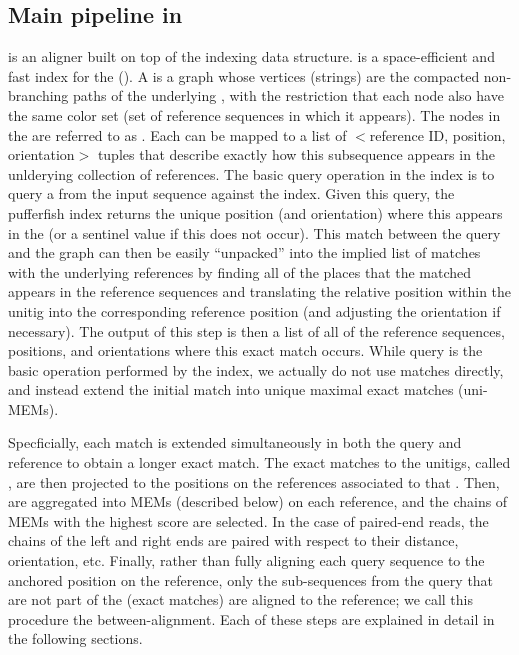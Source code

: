 \subsection{Main pipeline in \puffaligner}
\puffaligner is an aligner built on top of the \pufferfish indexing data structure. \pufferfish is a 
space-efficient and fast index for the \ccdbg (\ccdbgshort). A \ccdbg is a graph whose vertices
(strings) are the compacted non-branching paths of the underlying \dbg, with the restriction that 
each node also have the same color set (set of reference sequences in which it appears). The nodes in the
\ccdbg are referred to as \unitigs. Each \unitig can be mapped to a list of $<$reference ID, position, 
orientation$>$ tuples that describe exactly how this subsequence appears in the unlderying
collection of references. The basic query operation in the \pufferfish index is to query 
a \kmer from the input sequence against the index. Given this query, the pufferfish index returns the unique
position (and orientation) where this \kmer appears in the \ccdbg (or  a sentinel value if this \kmer 
does not occur). This match between the query and the graph can then be easily ``unpacked'' into the implied list of 
matches with the underlying references by finding all of the places that the  matched \unitig appears in the 
reference sequences and translating the relative position within the unitig into the corresponding 
reference position (and adjusting the orientation if necessary). The output of this step is then a list of all 
of the reference sequences, positions, and orientations where this exact match occurs.  While \kmer query is the 
basic operation performed by the index, we actually do not use \kmer matches  directly, and instead 
extend the initial match into unique maximal exact matches (uni-MEMs).

Specficially, each \kmer match is extended simultaneously in both the  query and reference to 
obtain a longer exact match. The exact matches to the unitigs, called \unimems, are then projected to
the positions on the references associated to that \unitig. Then, \unimems  are aggregated into MEMs 
(described below) on each reference, and the chains of MEMs with the highest score are selected. 
In the case of paired-end reads, the chains of the left and right ends are paired with respect to their distance,
orientation, etc. Finally, rather than fully aligning each query sequence to the anchored position 
on the reference, only the sub-sequences from the query that are not part of the \unimems (exact
matches) are aligned to the reference; we call this procedure the between-\mem alignment. Each of 
these steps are explained in detail in the following sections.

